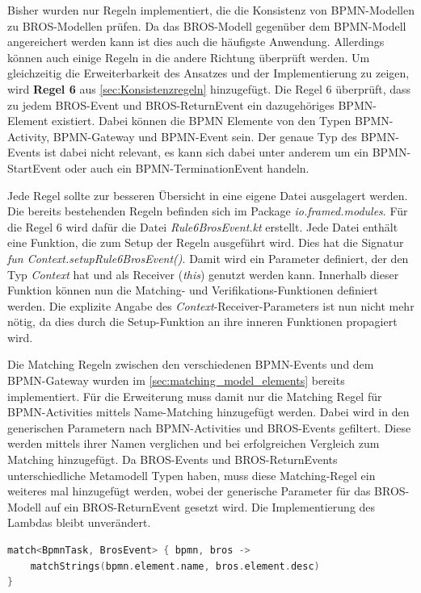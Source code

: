 Bisher wurden nur Regeln implementiert, die die Konsistenz von BPMN-Modellen zu BROS-Modellen prüfen.
Da das BROS-Modell gegenüber dem BPMN-Modell angereichert werden kann ist dies auch die häufigste Anwendung.
Allerdings können auch einige Regeln in die andere Richtung überprüft werden.
Um gleichzeitig die Erweiterbarkeit des Ansatzes und der Implementierung zu zeigen, wird \textbf{Regel 6} aus \cref{sec:Konsistenzregeln} hinzugefügt.
Die Regel 6 überprüft, dass zu jedem BROS-Event und BROS-ReturnEvent ein dazugehöriges BPMN-Element existiert. 
Dabei können die BPMN Elemente von den Typen BPMN-Activity, BPMN-Gateway und BPMN-Event sein. 
Der genaue Typ des BPMN-Events ist dabei nicht relevant, es kann sich dabei unter anderem um ein BPMN-StartEvent oder auch ein BPMN-TerminationEvent handeln.

Jede Regel sollte zur besseren Übersicht in eine eigene Datei ausgelagert werden.
Die bereits bestehenden Regeln befinden sich im Package \emph{io.framed.modules}.
Für die Regel 6 wird dafür die Datei \emph{Rule6BrosEvent.kt} erstellt.
Jede Datei enthält eine Funktion, die zum Setup der Regeln ausgeführt wird.
Dies hat die Signatur \emph{fun Context.setupRule6BrosEvent()}.
Damit wird ein Parameter definiert, der den Typ \emph{Context} hat und als Receiver (\emph{this}) genutzt werden kann.
Innerhalb dieser Funktion können nun die Matching- und Verifikations-Funktionen definiert werden.
Die explizite Angabe des \emph{Context}-Receiver-Parameters ist nun nicht mehr nötig, da dies durch die Setup-Funktion an ihre inneren Funktionen propagiert wird. 

Die Matching Regeln zwischen den verschiedenen BPMN-Events und dem BPMN-Gateway wurden im \cref{sec:matching_model_elements} bereits implementiert.
Für die Erweiterung muss damit nur die Matching Regel für BPMN-Activities mittels Name-Matching hinzugefügt werden.
Dabei wird in den generischen Parametern nach BPMN-Activities und BROS-Events gefiltert.
Diese werden mittels ihrer Namen verglichen und bei erfolgreichen Vergleich zum Matching hinzugefügt.
Da BROS-Events und BROS-ReturnEvents unterschiedliche Metamodell Typen haben, muss diese Matching-Regel ein weiteres mal hinzugefügt werden, wobei der generische Parameter für das BROS-Modell auf ein BROS-ReturnEvent gesetzt wird.
Die Implementierung des Lambdas bleibt unverändert.

\begin{lstlisting}[language=Kotlin, caption=Matching Regel zwischen BPMN-Activities und BROS-Events, label=lst:matching_activity_event]
match<BpmnTask, BrosEvent> { bpmn, bros ->
    matchStrings(bpmn.element.name, bros.element.desc)
}
\end{lstlisting}

